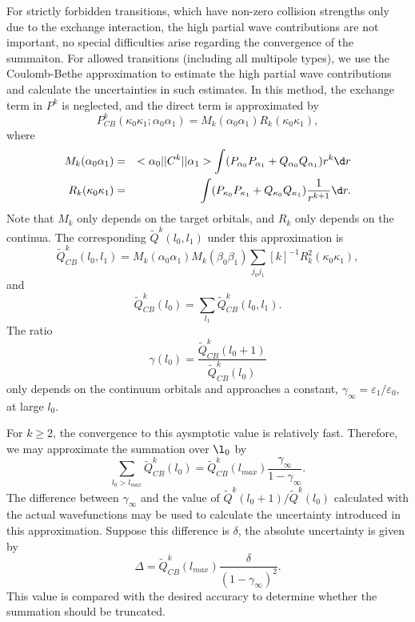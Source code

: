 \documentclass{elsart}
\begin{document}
For strictly forbidden transitions, which have non-zero collision strengths
only due to the exchange interaction, the high partial wave contributions are
not important, no special difficulties arise regarding the convergence of the
summaiton. 
For allowed transitions (including all multipole types), we use the
Coulomb-Bethe approximation to estimate the high partial wave contributions
and calculate the uncertainties in such estimates. In this
method, the exchange term in $P^k$ is neglected, and the direct term is
approximated by 
\begin{equation}
\label{eq_PkApprox}
P^k_{CB}(\kappa_0\kappa_1;\alpha_0\alpha_1) = 
M_k(\alpha_0\alpha_1)R_k(\kappa_0\kappa_1),
\end{equation}
where 
\begin{eqnarray}
M_k(\alpha_0\alpha_1) &=& <\alpha_0||C^k||\alpha_1>
\int (P_{\alpha_0}P_{\alpha_1}+Q_{\alpha_0}Q_{\alpha_1})r^k\d r \nonumber\\
R_k(\kappa_0\kappa_1) &=&
\int (P_{\kappa_0}P_{\kappa_1}+Q_{\kappa_0}Q_{\kappa_1})
\frac{1}{r^{k+1}}\d r.  
\end{eqnarray}
Note that $M_k$ only depends on the target orbitals, and $R_k$ only depends on
the continua. The corresponding $\tilde{Q}^k(l_0,l_1)$ under this
approximation is 
\begin{equation}
\tilde{Q}^k_{CB}(l_0, l_1) = M_k(\alpha_0\alpha_1)M_k(\beta_0\beta_1)
\sum_{j_0j_1}[k]^{-1}R_k^2(\kappa_0\kappa_1),
\end{equation}
and 
\begin{equation}
\tilde{Q}^k_{CB}(l_0)=\sum_{l_1}\tilde{Q}^k_{CB}(l_0,l_1). 
\end{equation}
The ratio
\begin{equation}
\gamma(l_0) = \frac{\tilde{Q}^k_{CB}(l_0+1)}{\tilde{Q}^k_{CB}(l_0)}
\end{equation}
only depends on the continuum orbitals and approaches a constant,
$\gamma_{\infty}=\varepsilon_1/\varepsilon_0$, at large $l_0$. 

For $k \ge 2$,
the convergence to this aysmptotic value is relatively fast. Therefore, we may
approximate the summation over $\l_0$ by
\begin{equation}
\sum_{l_0>l_{max}}\tilde{Q}^k_{CB}(l_0) =
\tilde{Q}^k_{CB}(l_{max})\frac{\gamma_{\infty}}{1-\gamma_{\infty}}. 
\end{equation}
The difference between $\gamma_{\infty}$ and the value of 
$\tilde{Q}^k(l_0+1)/\tilde{Q}^k(l_0)$ calculated with the actual wavefunctions
may be used to calculate the uncertainty introduced in this
approximation. Suppose this 
difference is $\delta$, the absolute uncertainty is given by
\begin{equation}
\Delta = \tilde{Q}^k_{CB}(l_{max})\frac{\delta}{(1-\gamma_{\infty})^2}.
\end{equation}
This value is compared with the desired accuracy to determine whether the
summation should be truncated.
\end{document}
